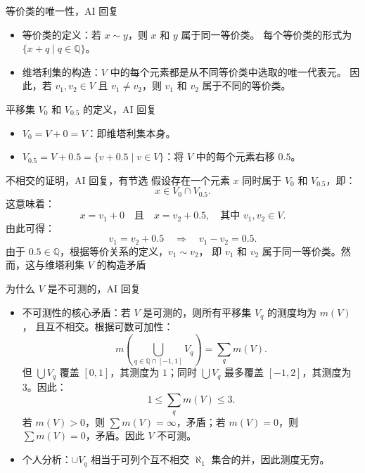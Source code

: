 \documentclass{beamer}
\begin{document}
\begin{frame}{等价类的唯一性，AI 回复}
\begin{itemize}
  \item 等价类的定义：若 $x \sim y$，则 $x$ 和 $y$ 属于同一等价类。
  每个等价类的形式为 $\{x + q \mid q \in \mathbb{Q}\}$。
  \item 维塔利集的构造：$V$ 中的每个元素都是从不同等价类中选取的唯一代表元。
  因此，若 $v_1, v_2 \in V$ 且 $v_1 \neq v_2$，则 $v_1$ 和 $v_2$ 属于不同的等价类。
\end{itemize}
\end{frame}

\begin{frame}{平移集 $V_0$ 和 $V_{0.5}$ 的定义，AI 回复}
\begin{itemize}
  \item $V_0 = V + 0 = V$：即维塔利集本身。
  \item $V_{0.5} = V + 0.5 = \{v + 0.5 \mid v \in V\}$：将 $V$ 中的每个元素右移 $0.5$。
\end{itemize}
\end{frame}

\begin{frame}{不相交的证明，AI 回复，有节选}
假设存在一个元素 $x$ 同时属于 $V_0$ 和 $V_{0.5}$，即：
$$
x \in V_0 \cap V_{0.5}.
$$
这意味着：
$$
x = v_1 + 0 \quad \text{且} \quad x = v_2 + 0.5, \quad \text{其中 } v_1, v_2 \in V.
$$
由此可得：
$$
v_1 = v_2 + 0.5 \quad \Rightarrow \quad v_1 - v_2 = 0.5.
$$
由于 $0.5 \in \mathbb{Q}$，根据等价关系的定义，$v_1 \sim v_2$，
即 $v_1$ 和 $v_2$ 属于同一等价类。然而，这与维塔利集 $V$ 的构造矛盾  
\end{frame}

\begin{frame}{为什么 $V$ 是不可测的，AI 回复}
  \small
  \begin{itemize}
    \item 不可测性的核心矛盾：若 $V$ 是可测的，则所有平移集 $V_q$ 的测度均为 $m(V)$，
且互不相交。根据可数可加性：
  $$
  m\left(\bigcup_{q \in \mathbb{Q} \cap [-1, 1]} V_q\right) = \sum_{q} m(V).
  $$
  但 $\bigcup V_q$ 覆盖 $[0, 1]$，其测度为 $1$；同时 $\bigcup V_q$ 最多覆盖 $[-1, 2]$，其测度为 3。因此：
  $$
  1 \leq \sum_{q} m(V) \leq 3.
  $$
  若 $m(V) > 0$，则 $\sum m(V) = \infty$，矛盾；若 $m(V) = 0$，则 $\sum m(V) = 0$，矛盾。因此 $V$ 不可测。
  \item 个人分析：$\cup V_q$ 相当于可列个互不相交 $\aleph_1$ 集合的并，因此测度无穷。
  \end{itemize}
\end{frame}
\end{document}
